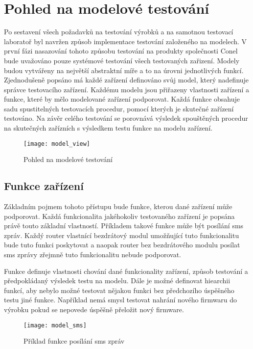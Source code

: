 \chapter{Pohled na modelové testování}

Po sestavení všech požadavků na testování výrobků a na samotnou testovací laboratoř byl navržen způsob implementace testování založeného na modelech. V první fázi nasazování tohoto způsobu testování na produkty společnosti Conel bude uvažováno pouze systémové testování všech testovaných zařizení. Modely budou vytvářeny na největší abstraktní míře a to na úrovni jednotlivých funkcí. Zjednodušeně popsáno má každé zařízení definováno svůj model, který nadefinuje správce testovacího zařízení. Každému modelu jsou přiřazeny vlastnosti zařízení a funkce, které by mělo modelované zařízení podporovat. Každá funkce obsahuje sadu spustitelných testovacích procedur, pomocí kterých je skutečné zařízení testováno. Na závěr celého testování se porovnává výsledek spouštěných procedur na skutečných zařízních s výsledkem testu funkce na modelu zařízení.

\begin{figure}[h]
  \centering
  \texttt{[image: model\_view]}
  \caption{Pohled na modelové testování}
  \label{fig:model_view}
\end{figure}

\section{Funkce zařízení}

Základním pojmem tohoto přístupu bude funkce, kterou dané zařízení může podporovat. Každá funkcionalita jakéhokoliv testovaného zařízení je popsána právě touto základní vlastností. Příkladem takové funkce může být posílání sms zpráv. Každý router vlastnící bezdrátový modul umožňující tuto funkcionalitu bude tuto funkci poskytovat a naopak router bez bezdrátového modulu posílat sms zprávy zřejmně tuto funkcionalitu nebude podporovat.

Funkce definuje vlastnosti chování dané funkcionality zařízení, způsob testování a předpokládaný výsledek testu na modelu. Dále je možné definovat hiearchii funkcí, aby nebylo možné testovat nějakou funkci bez předchozího úspěšného testu jiné funkce. Například nemá smysl testovat nahrání nového firmwaru do výrobku pokud se nepovede úspěšně přeložit nový firmware.

\begin{figure}[h]
  \centering
  \texttt{[image: model\_sms]}
  \caption{Příklad funkce posílání sms zpráv}
  \label{fig:model_sms}
\end{figure}

